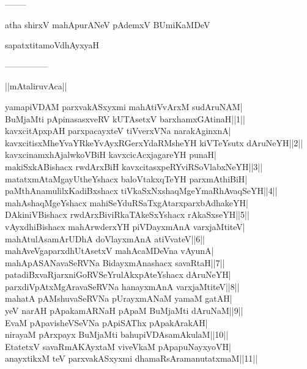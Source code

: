 \documentclass{article}
\begin{document}
\begin{center}
--------
\end{center}

\begin{center}
atha shirxV mahApurANeV pAdemxV BUmiKaMDeV
\end{center}

\begin{center}
sapatxtitamoVdhAyxyaH
\end{center}

\begin{center}

---------------
\end{center}

\begin{center}
||mAtaliruvAca||
\end{center}

yamapiVDAM parxvakASxyxmi mahAtiVvArxM sudAruNAM|\\
BuMjaMti pApinasasxveRV kUTAsetxV barxhamxGAtinaH||1||\\
kavxcitApxpAH parxpacayxteV tiVverxVNa narakAginxnA|\\
kavxcitisxMheYvaYRkeYvAyxRGerxYdaRMsheYH kiVTeYsutx dAruNeYH||2||\\
kavxcinamxhAjalwkoVBiH kavxcicAcxjagareYH punaH|\\
makiSxkABishacx rwdArxBiH kavxcitasxpeRYviRSoVlabxNeYH||3||\\
matatxmAtaMgayUtheYshacx baloVtakxqTeYH parxmAthiBiH|\\
paMthAnamulilxKadiBxshacx tiVkaSxNxshaqMgeYmaRhAvaqSeYH||4||\\
mahAshaqMgeYshacx mahiSeYduRSaTxgAtarxparxbAdhakeYH|\\
DAkiniVBishacx rwdArxBiviRkaTAkeSxYshacx rAkaSxseYH||5||\\
vAyxdhiBishacx mahArwderxYH piVDayxmAnA varxjaMtiteV|\\
mahAtulAsamArUDhA doVlayxmAnA atiVvateV||6||\\
mahAveVgaparxdhUtAsetxV mahAcaMDeVna vAyunA|\\
mahApASANavaSeRVNa BidayxmAnashacx savaRtaH||7||\\
patadiBxvaRjarxniGoRVSeYrulAkxpAteYshacx dAruNeYH|\\
parxdiVpAtxMgAravaSeRVNa hanayxmAnA varxjaMtiteV||8||\\
mahatA pAMshuvaSeRVNa pUrayxmANaM yamaM gatAH|\\
yeV narAH pApakamARNaH pApaM BuMjaMti dAruNaM||9||\\
EvaM pApavisheVSeVNa pApiSAThx pApakArakAH|\\
nirayaM pArxpayx BuMjaMti bahupiVDAsamAkulaM||10||\\
EtatetxV savaRmAKAyxtaM viveVkaM pApapuNayxyoVH|\\
anayxtikxM teV parxvakASxyxmi dhamaRsAramanutatxmaM||11||
\end{document}
